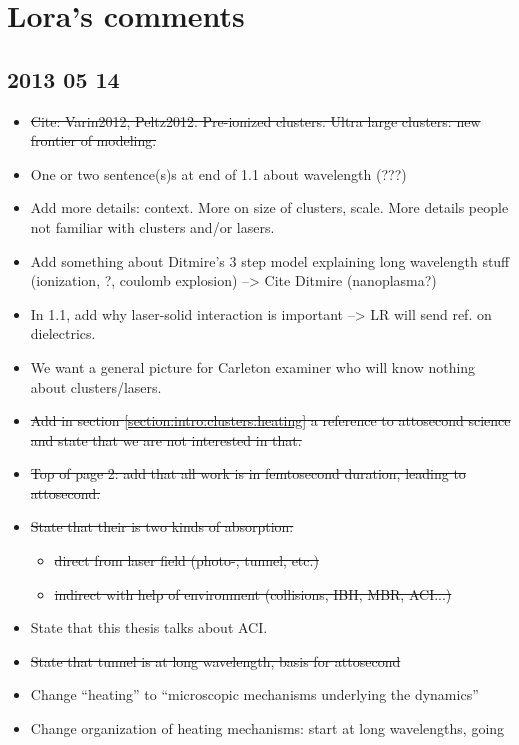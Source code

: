 \section*{Lora's comments}

\subsection*{2013 05 14}

\begin{itemize}
\item \sout{Cite: Varin2012, Peltz2012. Pre-ionized
clusters. Ultra large clusters: new frontier of modeling.}
\item One or two sentence(s)s at end of 1.1 about wavelength (???)
\item Add more details: context. More on size of clusters, scale. More details
people not familiar with clusters and/or lasers.
\item Add something about Ditmire's 3 step model explaining long wavelength stuff
(ionization, ?, coulomb explosion) --> Cite Ditmire (nanoplasma?)
\item In 1.1, add why laser-solid interaction is important --> LR will send ref.
on dielectrics.
\item We want a general picture for Carleton examiner who will know nothing about
clusters/lasers.
\item \sout{Add in section \ref{section:intro:clusters:heating} a reference to
attosecond science and state that we are not interested in that.}
\item \sout{Top of page 2: add that all work is in femtosecond duration, leading to
attosecond.}
\item \sout{State that their is two kinds of absorption:}
    \begin{itemize}
    \item \sout{direct from laser field (photo-, tunnel, etc.)}
    \item \sout{indirect with help of environment (collisions, IBH, MBR, ACI...)}
    \end{itemize}
\item State that this thesis talks about ACI.
\item \sout{State that tunnel is at long wavelength, basis for attosecond}
\item Change ``heating'' to ``microscopic mechanisms underlying the dynamics''
\item Change organization of heating mechanisms: start at long wavelengths, going

\end{itemize}

